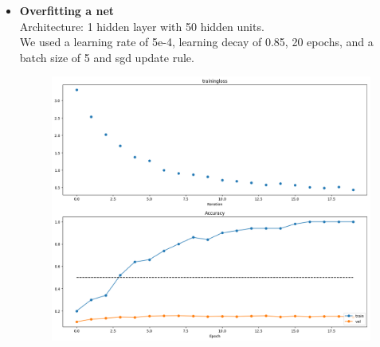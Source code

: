 \begin{itemize}
  
  \item \textbf{Overfitting a net}\\
    Architecture: 1 hidden layer with 50 hidden units.\\
    We used a learning rate of 5e-4, learning decay of 0.85, 20 epochs, and a batch size of 5 and sgd update rule.
    

    \begin{figure}[!ht]
        \centering
        {{\includegraphics[scale = 0.35]{../nets/overfit_net/diagrams.png}}}  
    \end{figure}



\end{itemize}
